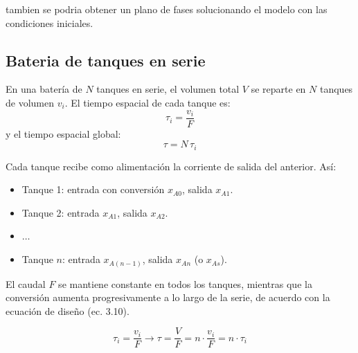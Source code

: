 tambien se podria obtener un plano de fases solucionando el modelo con las condiciones iniciales.
\subsection{Bateria de tanques en serie}
\begin{flushleft}
	En una batería de $N$ tanques en serie, el volumen total $V$ se reparte en $N$ tanques de volumen $v_i$. El tiempo espacial de cada tanque es:
	\[
		\tau_i = \frac{v_i}{F}
	\]
	y el tiempo espacial global:
	\[
		\tau = N\,\tau_i
	\]

	Cada tanque recibe como alimentación la corriente de salida del anterior. Así:
	\begin{itemize}
		\item Tanque 1: entrada con conversión $x_{A0}$, salida $x_{A1}$.
		\item Tanque 2: entrada $x_{A1}$, salida $x_{A2}$.
		\item $\dots$
		\item Tanque $n$: entrada $x_{A(n-1)}$, salida $x_{An}$ (o $x_{As}$).
	\end{itemize}

	El caudal $F$ se mantiene constante en todos los tanques, mientras que la conversión aumenta progresivamente a lo largo de la serie, de acuerdo con la ecuación de diseño (ec. 3.10).
\end{flushleft}
\begin{equation}
	\tau_i = \frac{v_i}{F} \rightarrow \tau = \frac{V}{F} = n\cdot \frac{v_i}{F} = n\cdot \tau_i
\end{equation}

